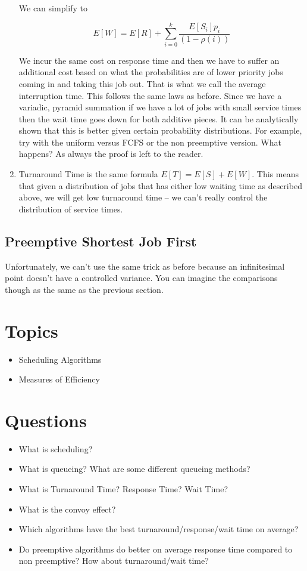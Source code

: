 \begin{enumerate}
  We can simplify to

  \[
  E[W] = E[R] + \sum\limits_{i=0}^k \frac{E[S_i]p_i}{(1 - \rho(i))}
  \]

  We incur the same cost on response time and then we have to suffer an additional cost based on what the probabilities are of lower priority jobs coming in and taking this job out.
  That is what we call the average interruption time.
  This follows the same laws as before.
  Since we have a variadic, pyramid summation if we have a lot of jobs with small service times then the wait time goes down for both additive pieces.
  It can be analytically shown that this is better given certain probability distributions.
  For example, try with the uniform versus FCFS or the non preemptive version.
  What happens?
  As always the proof is left to the reader.

\item Turnaround Time is the same formula $E[T] = E[S] + E[W]$. This means that given a distribution of jobs that has either low waiting time as described above, we will get low turnaround time -- we can't really control the distribution of service times.
\end{enumerate}

\subsection{Preemptive Shortest Job First}

Unfortunately, we can't use the same trick as before because an infinitesimal point doesn't have a controlled variance.
You can imagine the comparisons though as the same as the previous section.

\section{Topics}

\begin{itemize}
\tightlist
\item
  Scheduling Algorithms
\item
  Measures of Efficiency
\end{itemize}

\section{Questions}

\begin{itemize}
\tightlist
\item
  What is scheduling?
\item
  What is queueing? What are some different queueing methods?
\item
  What is Turnaround Time? Response Time? Wait Time?
\item
  What is the convoy effect?
\item
  Which algorithms have the best turnaround/response/wait time on average?
\item
  Do preemptive algorithms do better on average response time compared to non preemptive? How about turnaround/wait time?
\end{itemize}




